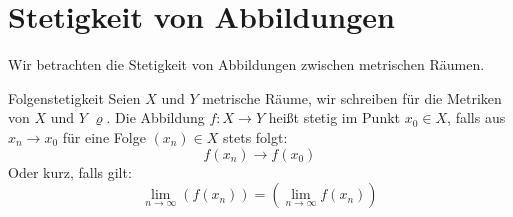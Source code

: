 \chapter{Stetigkeit von Abbildungen}
Wir betrachten die Stetigkeit von Abbildungen zwischen metrischen Räumen.
\begin{definition}{Folgenstetigkeit}
	Seien $X$ und $Y$ metrische Räume, wir schreiben für die Metriken von $X$ und $Y$ $\varrho$.
	Die Abbildung $f:X\rightarrow Y$ heißt stetig im Punkt $x_0\in X$, falls aus $x_n\rightarrow x_0$ für eine Folge $(x_n)\in X$ stets folgt:
	\begin{equation*}
		f(x_n)\rightarrow f(x_0)
	\end{equation*}
	Oder kurz, falls gilt:
	\begin{equation*}
		\lim\limits_{n\to\infty}(f(x_n))=\left(\lim\limits_{n\to\infty}f(x_n)\right)
	\end{equation*}
\end{definition}

